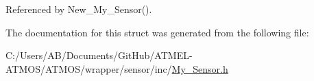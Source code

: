 Referenced by New\-\_\-\-My\-\_\-\-Sensor().



The documentation for this struct was generated from the following file\-:\begin{DoxyCompactItemize}
\item 
C\-:/\-Users/\-A\-B/\-Documents/\-Git\-Hub/\-A\-T\-M\-E\-L-\/\-A\-T\-M\-O\-S/\-A\-T\-M\-O\-S/wrapper/sensor/inc/\hyperlink{_my___sensor_8h}{My\-\_\-\-Sensor.\-h}\end{DoxyCompactItemize}
